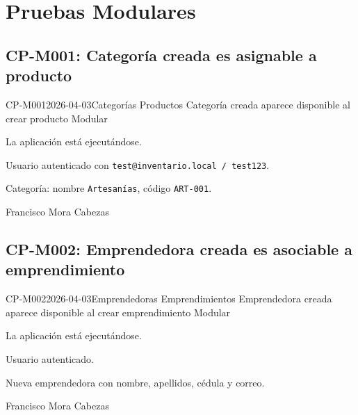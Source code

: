 \clearpage
\section{Pruebas Modulares}

\subsection{CP-M001: Categoría creada es asignable a producto}
\def\cpPasos{%
  \item Navegar a ``Categorías'' \arr{} nueva categoría.
  \item Ingresar nombre y código; guardar.
  \item Navegar a ``Productos'' \arr{} nuevo producto.
  \item Verificar que la categoría aparece en el selector.}
\def\cpResultadoE{%
  \item La categoría recién creada aparece disponible en el formulario de producto.}
\def\cpResultadoO{La categoría ``Artesanías'' ya existía. Al ingresar código nuevo el
  sistema la actualizó (código único). Al ir a Productos, la categoría sí apareció
  disponible en el selector. El sistema previene duplicados por código correctamente.}
\casoprueba
  {CP-M001}{2026-04-03}{Categorías \arr{} Productos}
  {Categoría creada aparece disponible al crear producto}
  {Modular}{\estadoAprobado}
  {\item La aplicación está ejecutándose.
   \item Usuario autenticado con \texttt{test@inventario.local / test123}.}
  {\item Categoría: nombre \texttt{Artesanías}, código \texttt{ART-001}.}
  {Francisco Mora Cabezas}

\subsection{CP-M002: Emprendedora creada es asociable a emprendimiento}
\def\cpPasos{%
  \item Navegar a ``Emprendedoras'' \arr{} nueva emprendedora.
  \item Ingresar datos y guardar.
  \item Navegar a ``Emprendimientos'' \arr{} nuevo emprendimiento.
  \item Verificar que la emprendedora aparece en el selector.}
\def\cpResultadoE{%
  \item La emprendedora recién creada está disponible para asociar al emprendimiento.}
\def\cpResultadoO{La emprendedora creada apareció disponible en el formulario de
  emprendimientos correctamente.}
\casoprueba
  {CP-M002}{2026-04-03}{Emprendedoras \arr{} Emprendimientos}
  {Emprendedora creada aparece disponible al crear emprendimiento}
  {Modular}{\estadoAprobado}
  {\item La aplicación está ejecutándose.
   \item Usuario autenticado.}
  {\item Nueva emprendedora con nombre, apellidos, cédula y correo.}
  {Francisco Mora Cabezas}

